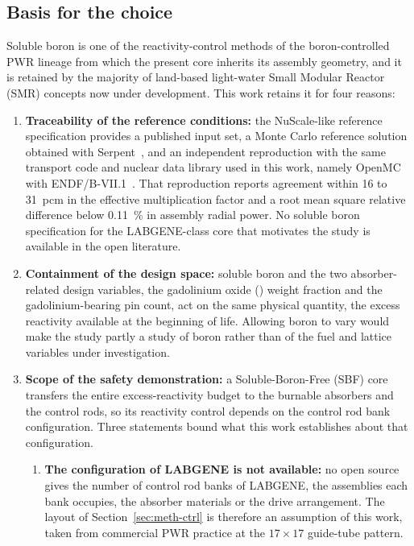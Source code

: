 \subsection{Basis for the choice}
\label{sec:meth-boron-basis}

Soluble boron is one of the reactivity-control methods of the boron-controlled
PWR lineage from which the present core
inherits its assembly geometry, and it is retained by the majority of
land-based light-water Small Modular Reactor (SMR) concepts now under
development. This work retains it for four reasons:

\begin{enumerate}
  \item \textbf{Traceability of the reference conditions:} the
        NuScale-like reference specification provides a published
        input set, a
        Monte Carlo reference solution obtained with
        Serpent~\cite{fridman_nuscale_benchmark_2023}, and an
        independent reproduction with the same transport code and
        nuclear data library used in this work, namely OpenMC with
        ENDF/B-VII.1~\cite{ez_aldeen_2025}. That
        reproduction reports agreement within 16 to \SI{31}{pcm} in the
        effective multiplication factor and a root mean square relative
        difference below \SI{0.11}{\percent} in assembly radial power.
        No soluble boron specification for the LABGENE-class core that
        motivates the study is available in the open literature.
  \item \textbf{Containment of the design space:} soluble boron and the
        two absorber-related design variables, the gadolinium oxide
        () weight fraction and the gadolinium-bearing pin
        count, act on the same physical quantity, the excess
        reactivity available at the beginning of life. Allowing boron to
        vary would make the study partly a study of boron rather than
        of the fuel and lattice variables under investigation.
  \item \textbf{Scope of the safety demonstration:} a
        Soluble-Boron-Free (SBF) core transfers the entire
        excess-reactivity budget to the burnable absorbers and the
        control rods, so its reactivity control depends on the control rod bank configuration. Three statements bound what this work
        establishes about that configuration.

        \begin{enumerate}[label=\theenumi.\arabic*, ref=\theenumi.\arabic*]
          \item \textbf{The configuration of LABGENE is not available:} no open source gives the number of control
                rod banks of LABGENE, the assemblies each bank occupies,
                the absorber materials or the drive arrangement. The
                layout of Section~\ref{sec:meth-ctrl} is therefore an
                assumption of this work, taken from commercial PWR
                practice at the $17\times17$ guide-tube pattern.


\end{enumerate}
\end{enumerate}
